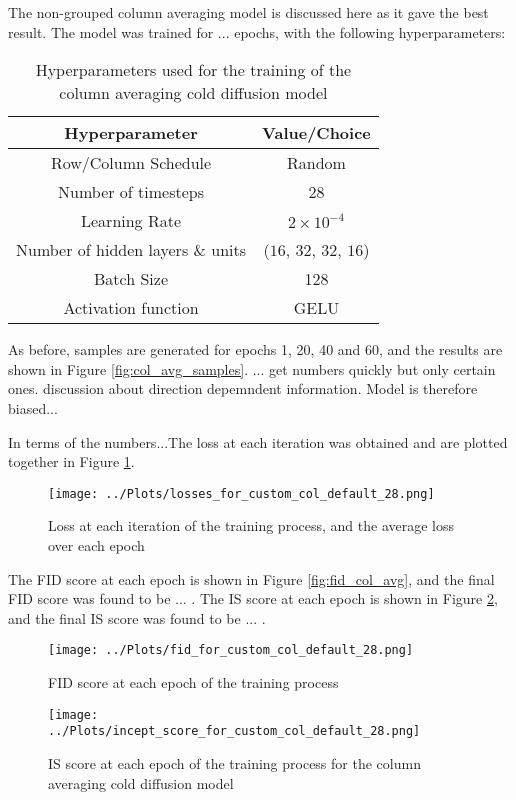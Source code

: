 \documentclass[12pt]{report} %
\begin{document}
The non-grouped column averaging model is discussed here as it gave the best result. The model was trained for ... epochs, with the following hyperparameters:

\begin{table}[h]
  \centering
  \begin{tabular}{c c}
    \hline
    Hyperparameter & Value/Choice \\
    \hline
    Row/Column Schedule & Random \\
    Number of timesteps & 28 \\
    Learning Rate & $2 \times 10^{-4}$ \\
    Number of hidden layers \& units & ($16$, $32$, $32$, $16$) \\
    Batch Size & 128 \\
    Activation function & GELU \\
    \hline
  \end{tabular}
  \caption{Hyperparameters used for the training of the column averaging cold diffusion model}
  \label{tab:hyperparams3}
\end{table}

As before, samples are generated for epochs 1, 20, 40 and 60, and the results are shown in Figure \ref{fig:col_avg_samples}.  ... get numbers quickly but only certain ones. discussion about direction depemndent information. Model is therefore biased...

In terms of the numbers...The loss at each iteration was obtained and are plotted together in Figure \ref{fig:loss3}.

\begin{figure}[h]
  \centering
  \texttt{[image: ../Plots/losses\_for\_custom\_col\_default\_28.png]}
  \caption{Loss at each iteration of the training process, and the average loss over each epoch}
  \label{fig:loss3}
\end{figure}

The FID score at each epoch is shown in Figure \ref{fig:fid_col_avg}, and the final FID score was found to be ... . The IS score at each epoch is shown in Figure \ref{fig:is_col_avg}, and the final IS score was found to be ... .

\begin{figure}[h]
  \centering
  \texttt{[image: ../Plots/fid\_for\_custom\_col\_default\_28.png]}
  \caption{FID score at each epoch of the training process}
  \label{fig:fid_col_avg}

  \texttt{[image: ../Plots/incept\_score\_for\_custom\_col\_default\_28.png]}
  \caption{IS score at each epoch of the training process for the column averaging cold diffusion model}
  \label{fig:is_col_avg}
\end{figure}
\end{document}
